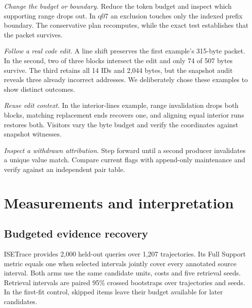 \documentclass[conference]{IEEEtran}
\begin{document}
\textit{Change the budget or boundary.} Reduce the token budget and inspect which supporting range drops out. In q07 an exclusion touches only the indexed prefix boundary. The conservative plan recomputes, while the exact test establishes that the packet survives.

\textit{Follow a real code edit.} A line shift preserves the first example's 315-byte packet. In the second, two of three blocks intersect the edit and only 74 of 507 bytes survive. The third retains all 14 IDs and 2,044 bytes, but the snapshot audit reveals three already incorrect addresses. We deliberately chose these examples to show distinct outcomes.

\textit{Reuse edit context.} In the interior-lines example, range invalidation drops both blocks, matching replacement ends recovers one, and aligning equal interior runs restores both. Visitors vary the byte budget and verify the coordinates against snapshot witnesses.

\textit{Inspect a withdrawn attribution.} Step forward until a second producer invalidates a unique value match. Compare current flags with append-only maintenance and verify against an independent pair table.

\section{Measurements and interpretation}
\subsection{Budgeted evidence recovery}
ISETrace provides 2,000 held-out queries over 1,207 trajectories. Its Full Support metric equals one when selected intervals jointly cover every annotated source interval. Both arms use the same candidate units, costs and five retrieval seeds. Retrieval intervals are paired 95\% crossed bootstraps over trajectories and seeds. In the first-fit control, skipped items leave their budget available for later candidates.
\end{document}
